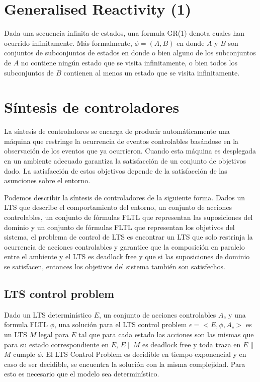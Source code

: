 \vspace{\baselineskip}


\section{Generalised Reactivity (1)}

Dada una secuencia infinita de estados, una formula GR(1) denota cuales han ocurrido infinitamente. 
Más formalmente, $\phi = (A, B)$ en donde $A$ y $B$ son conjuntos de subconjuntos de estados en donde o bien alguno de los
subconjuntos de $A$ no contiene ningún estado que se visita infinitamente, o bien todos los subconjuntos de $B$ contienen 
al menos un estado que se visita infinitamente.

\section{Síntesis de controladores}

La síntesis de controladores se encarga de producir automáticamente una máquina que restringe la ocurrencia de eventos
controlables basándose en la observación de los eventos que ya ocurrieron. Cuando esta máquina es desplegada en un ambiente
adecuado garantiza la satisfacción de un conjunto de objetivos dado. La satisfacción de estos objetivos depende de la
satisfacción de las asunciones sobre el entorno.

\vspace{\baselineskip}
Podemos describir la síntesis de controladores de la siguiente forma. Dados un LTS que describe el comportamiento
del entorno, un conjunto de acciones controlables, un conjunto de fórmulas FLTL que representan las suposiciones
del dominio y un conjunto de fórmulas FLTL que representan los objetivos del sistema, el problema de control de
LTS es encontrar un LTS que solo restrinja la ocurrencia de acciones controlables y garantice que la composición
en paralelo entre el ambiente y el LTS es deadlock free y que si las suposiciones de dominio se satisfacen, entonces
los objetivos del sistema también son satisfechos.

\subsection{LTS control problem}

Dado un LTS determinístico $E$, un conjunto de acciones controlables $A_{c}$ y una formula FLTL $\phi$, una solución 
para el LTS control problem $\epsilon = <E, \phi, A_{c}>$ es un LTS $M$ legal para $E$ tal que para cada estado las
acciones son las mismas que para su estado correspondiente en $E$, $E\parallel$$M$ es deadlock free y toda traza en
$E\parallel$$M$ cumple $\phi$. El LTS Control Problem es decidible en tiempo exponencial y en caso de ser decidible,
se encuentra la solución con la misma complejidad. Para esto es necesario que el modelo sea determinístico.

